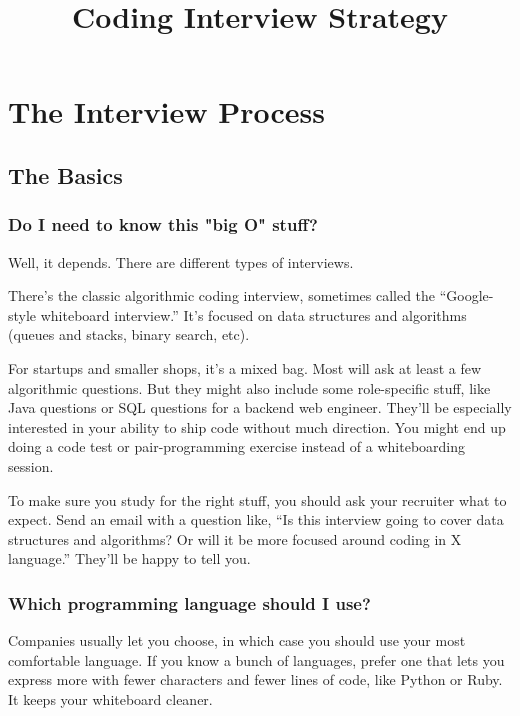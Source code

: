 \documentclass{article}
\begin{document}
\title{Coding Interview Strategy}
\maketitle{}
\newpage{}


\section{The Interview Process}

\subsection{The Basics}

\subsubsection{Do I need to know this "big O" stuff?}

Well, it depends. There are different types of interviews.

There’s the classic algorithmic coding interview, sometimes called the “Google-style whiteboard interview.” It’s focused on data structures and algorithms (queues and stacks, binary search, etc).


For startups and smaller shops, it’s a mixed bag. Most will ask at least a few algorithmic questions. But they might also include some role-specific stuff, like Java questions or SQL questions for a backend web engineer. They’ll be especially interested in your ability to ship code without much direction. You might end up doing a code test or pair-programming exercise instead of a whiteboarding session.


To make sure you study for the right stuff, you should ask your recruiter what to expect. Send an email with a question like, “Is this interview going to cover data structures and algorithms? Or will it be more focused around coding in X language.” They’ll be happy to tell you.

\subsubsection{Which programming language should I use?}

Companies usually let you choose, in which case you should use your most comfortable language. If you know a bunch of languages, prefer one that lets you express more with fewer characters and fewer lines of code, like Python or Ruby. It keeps your whiteboard cleaner.
\end{document}
